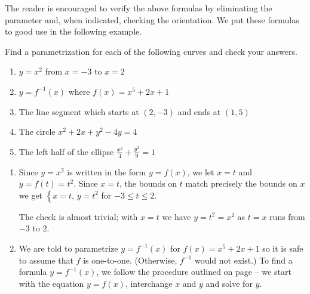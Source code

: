 \documentclass{ximera}
\begin{document}
 


 

The reader is encouraged to verify the above formulas by eliminating the parameter and, when indicated, checking the orientation.  We put these formulas to good use in the following example.

\begin{example} \label{recttoparametric}  Find a parametrization for each of the following curves and check your answers.

\begin{enumerate}

\item $y = x^2$ from $x = -3$ to $x = 2$

\item  $y = f^{-1}(x)$ where $f(x) = x^5 + 2x + 1$

\item  The line segment which starts at $(2,-3)$ and ends at $(1,5)$

\item  The circle $x^2 + 2x + y^2 - 4y = 4$

\item  The left half of the ellipse $\frac{x^2}{4} + \frac{y^2}{9} = 1$

\end{enumerate}

\begin{explanation}
    


\begin{enumerate}

\item  Since $y = x^2$ is written in the form $y = f(x)$, we let $x = t$ and $y = f(t) = t^2$.  Since $x=t$, the bounds on $t$ match precisely the bounds on $x$  we get $\left\{ x = t, \, y = t^2 \right.$ for $-3 \leq t \leq 2$.  

 

The check is almost trivial; with $x=t$ we have $y = t^2 = x^2$ as $t = x$ runs from $-3$ to $2$.

\item  We are told to parametrize $y = f^{-1}(x)$ for $f(x) = x^5 + 2x + 1$ so it is safe to assume that $f$ is one-to-one.  (Otherwise, $f^{-1}$ would not exist.)  To find a formula $y = f^{-1}(x)$, we  follow the procedure outlined on page \pageref{inverseprocedure} -- we start with the equation $y = f(x)$, interchange $x$ and $y$ and solve for $y$.  


\end{enumerate}
\end{explanation}
\end{example}
\end{document}
